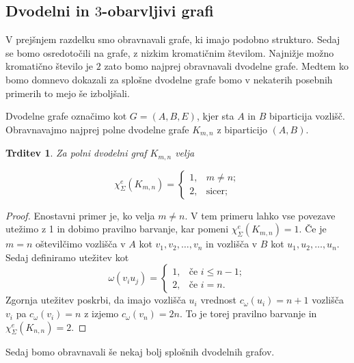 \documentclass[12pt,a4paper,twoside]{article}
\theoremstyle{definition} %
\theoremstyle{plain} %
\newtheorem{trditev}[definicija]{Trditev}
\newcommand{\ec}{\chi_{\Sigma}^e}
\numberwithin{equation}{section}  %
\begin{document}
 \subsection{Dvodelni in $3$-obarvljivi grafi}
V prejšnjem razdelku smo obravnavali grafe, ki imajo podobno strukturo. Sedaj se bomo osredotočili na grafe, z nizkim kromatičnim številom. Najnižje možno kromatično število je $2$ zato bomo najprej obravnavali dvodelne grafe. Medtem ko bomo domnevo dokazali za splošne dvodelne grafe bomo v nekaterih posebnih primerih to mejo še izboljšali.

 
 Dvodelne grafe označimo kot $G=(A, B, E)$, kjer sta $A$ in $B$ biparticija vozlišč.
Obravnavajmo najprej polne dvodelne grafe $K_{m,n}$ z biparticijo $(A, B)$.
\begin{trditev}
\label{res_dvo_complete}
Za polni dvodelni graf $K_{m,n}$ velja

$$\ec(K_{m,n}) = \begin{cases}
	1 ,& m \neq n;\\ 
	2 ,& \text{sicer};
	\end{cases} $$
\end{trditev}
\begin{proof}
 Enostavni primer je, ko velja $m \neq n$. V tem primeru lahko vse povezave utežimo z 1 in dobimo pravilno barvanje, kar pomeni $\ec(K_{m,n}) = 1$. Če je $m=n$ oštevilčimo vozlišča v $A$ kot $v_1, v_2, \ldots, v_n$ in vozlišča v $B$ kot $u_1, u_2, \ldots, u_n$. Sedaj definiramo utežitev kot
$$
\omega(v_i u_j) = 
\begin{cases}
1 , &\text {če } i \le n-1; \\
2, & \text{če } i=n.
\end{cases}
$$
Zgornja utežitev poskrbi, da imajo vozlišča $u_i$ vrednost $c_{\omega}(u_i) =n + 1$ vozlišča $v_i$ pa $c_{\omega}(v_i) = n$ z izjemo $c_{\omega}(v_n) = 2n$. To je torej pravilno barvanje in $\ec(K_{n,n}) = 2$.
\end{proof}
 Sedaj bomo obravnavali še nekaj bolj splošnih dvodelnih grafov.
\end{document}
